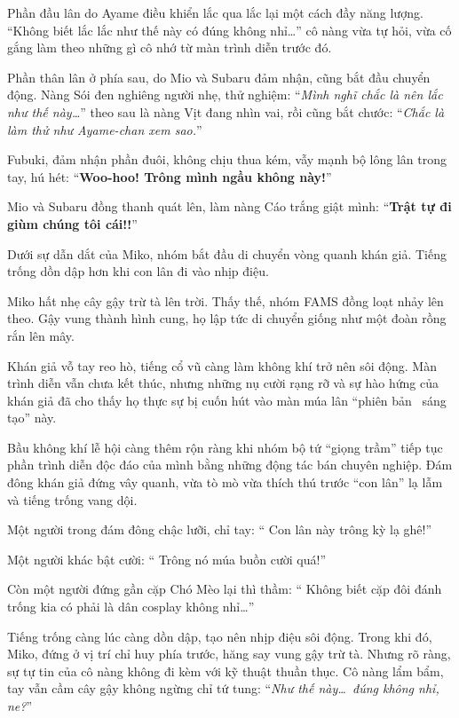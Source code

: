 \documentclass[../main.tex]{subfiles}
\begin{document}
Phần đầu lân do Ayame điều khiển lắc qua lắc lại một cách đầy năng lượng. ``Không biết lắc lắc như thế này có đúng không nhỉ\dots'' cô nàng vừa tự hỏi, vừa cố gắng làm theo những gì cô nhớ từ màn trình diễn trước đó.

Phần thân lân ở phía sau, do Mio và Subaru đảm nhận, cũng bắt đầu chuyển động. Nàng Sói đen nghiêng người nhẹ, thử nghiệm: ``\textit{Mình nghĩ chắc là nên lắc như thế này\dots}'' theo sau là nàng Vịt đang nhìn vai, rồi cũng bắt chước: ``\textit{Chắc là làm thử như Ayame-chan xem sao.}''

Fubuki, đảm nhận phần đuôi, không chịu thua kém, vẫy mạnh bộ lông lân trong tay, hú hét: ``\textbf{Woo-hoo! Trông mình ngầu không này!}''

Mio và Subaru đồng thanh quát lên, làm nàng Cáo trắng giật mình: ``\textbf{Trật tự đi giùm chúng tôi cái!!}''

Dưới sự dẫn dắt của Miko, nhóm bắt đầu di chuyển vòng quanh khán giả. Tiếng trống dồn dập hơn khi con lân đi vào nhịp điệu.

Miko hất nhẹ cây gậy trừ tà lên trời. Thấy thế, nhóm FAMS đồng loạt nhảy lên theo. Gậy vung thành hình cung, họ lập tức di chuyển giống như một đoàn rồng rắn lên mây.

Khán giả vỗ tay reo hò, tiếng cổ vũ càng làm không khí trở nên sôi động. Màn trình diễn vẫn chưa kết thúc, nhưng những nụ cười rạng rỡ và sự hào hứng của khán giả đã cho thấy họ thực sự bị cuốn hút vào màn múa lân ``phiên bản \hll\ sáng tạo'' này.

Bầu không khí lễ hội càng thêm rộn ràng khi nhóm bộ tứ ``giọng trầm'' tiếp tục phần trình diễn độc đáo của mình bằng những động tác bán chuyên nghiệp. Đám đông khán giả đứng vây quanh, vừa tò mò vừa thích thú trước ``con lân'' lạ lẫm và tiếng trống vang dội.

Một người trong đám đông chậc lưỡi, chỉ tay: ``{\color{red} Con lân này trông kỳ lạ ghê!}''

Một người khác bật cười: ``{\color{red} Trông nó múa buồn cười quá!}''

Còn một người đứng gần cặp Chó Mèo lại thì thầm: ``{\color{red} Không biết cặp đôi đánh trống kia có phải là dân cosplay không nhỉ\dots}''

Tiếng trống càng lúc càng dồn dập, tạo nên nhịp điệu sôi động. Trong khi đó, Miko, đứng ở vị trí chỉ huy phía trước, hăng say vung gậy trừ tà. Nhưng rõ ràng, sự tự tin của cô nàng không đi kèm với kỹ thuật thuần thục. Cô nàng lẩm bẩm, tay vẫn cầm cây gậy không ngừng chỉ tứ tung: ``\textit{Như thế này\dots\ đúng không nhỉ, ne?}''
\end{document}
